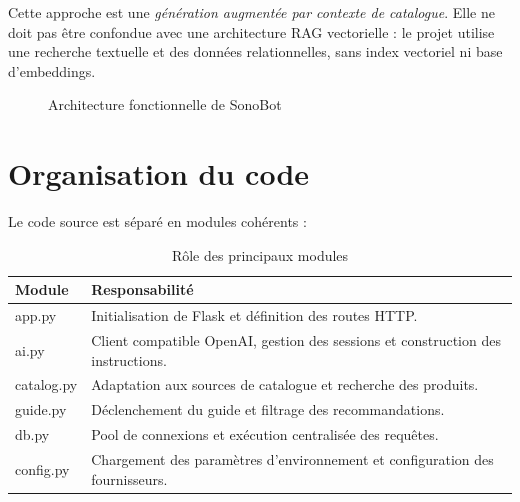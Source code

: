 \documentclass[12pt,a4paper,oneside]{report}
\begin{document}
Cette approche est une \emph{génération augmentée par contexte de catalogue}. Elle ne doit pas être confondue avec une architecture RAG vectorielle : le projet utilise une recherche textuelle et des données relationnelles, sans index vectoriel ni base d'embeddings.

\begin{figure}[H]
\centering
{}
\caption{Architecture fonctionnelle de SonoBot}
\end{figure}

\section{Organisation du code}
Le code source est séparé en modules cohérents :
\begin{table}[H]
\centering
\caption{Rôle des principaux modules}
\begin{tabularx}{\textwidth}{>{\ttfamily}l X}
\toprule
Module & Responsabilité \\
\midrule
app.py & Initialisation de Flask et définition des routes HTTP. \\
ai.py & Client compatible OpenAI, gestion des sessions et construction des instructions. \\
catalog.py & Adaptation aux sources de catalogue et recherche des produits. \\
guide.py & Déclenchement du guide et filtrage des recommandations. \\
db.py & Pool de connexions et exécution centralisée des requêtes. \\
config.py & Chargement des paramètres d'environnement et configuration des fournisseurs. \\
\bottomrule
\end{tabularx}
\end{table}
\end{document}

